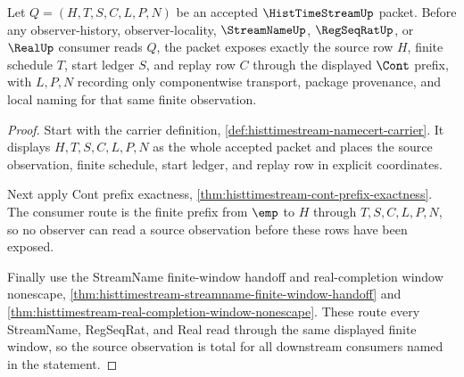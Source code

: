 \begin{theorem}
\label{thm:hist-time-stream-source-observation-totality}
Let $Q=(H,T,S,C,L,P,N)$ be an accepted $\HistTimeStreamUp$ packet. Before any observer-history, observer-locality, $\StreamNameUp$, $\RegSeqRatUp$, or $\RealUp$ consumer reads $Q$, the packet exposes exactly the source row $H$, finite schedule $T$, start ledger $S$, and replay row $C$ through the displayed $\Cont$ prefix, with $L,P,N$ recording only componentwise transport, package provenance, and local naming for that same finite observation.
\end{theorem}
\begin{proof}
Start with the carrier definition, \autoref{def:histtimestream-namecert-carrier}. It displays $H,T,S,C,L,P,N$ as the whole accepted packet and places the source observation, finite schedule, start ledger, and replay row in explicit coordinates.

Next apply Cont prefix exactness, \autoref{thm:histtimestream-cont-prefix-exactness}. The consumer route is the finite prefix from $\emp$ to $H$ through $T,S,C,L,P,N$, so no observer can read a source observation before these rows have been exposed.

Finally use the StreamName finite-window handoff and real-completion window nonescape, \autoref{thm:histtimestream-streamname-finite-window-handoff} and \autoref{thm:histtimestream-real-completion-window-nonescape}. These route every StreamName, RegSeqRat, and Real read through the same displayed finite window, so the source observation is total for all downstream consumers named in the statement.
\end{proof}

